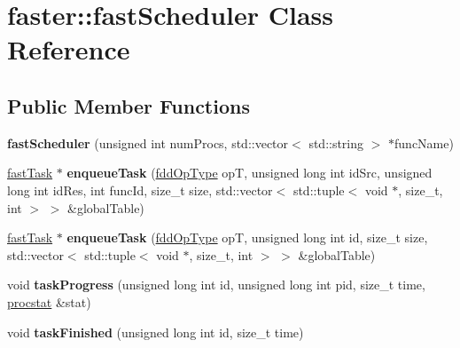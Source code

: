 \hypertarget{classfaster_1_1fastScheduler}{}\section{faster\+:\+:fast\+Scheduler Class Reference}
\label{classfaster_1_1fastScheduler}
\subsection*{Public Member Functions}
\begin{DoxyCompactItemize}
\item 
\hypertarget{classfaster_1_1fastScheduler_a5585b9363737823bf17e6782013b04a8}{}\label{classfaster_1_1fastScheduler_a5585b9363737823bf17e6782013b04a8} 
{\bfseries fast\+Scheduler} (unsigned int num\+Procs, std\+::vector$<$ std\+::string $>$ $\ast$func\+Name)
\item 
\hypertarget{classfaster_1_1fastScheduler_a25353e0b9cac5c731973ea0d453080e0}{}\label{classfaster_1_1fastScheduler_a25353e0b9cac5c731973ea0d453080e0} 
\hyperlink{classfaster_1_1fastTask}{fast\+Task} $\ast$ {\bfseries enqueue\+Task} (\hyperlink{namespacefaster_a64379512d12d41c6e58f176939abfd80}{fdd\+Op\+Type} opT, unsigned long int id\+Src, unsigned long int id\+Res, int func\+Id, size\+\_\+t size, std\+::vector$<$ std\+::tuple$<$ void $\ast$, size\+\_\+t, int $>$ $>$ \&global\+Table)
\item 
\hypertarget{classfaster_1_1fastScheduler_a3adc513709d0c00d1d6b9f62115c9284}{}\label{classfaster_1_1fastScheduler_a3adc513709d0c00d1d6b9f62115c9284} 
\hyperlink{classfaster_1_1fastTask}{fast\+Task} $\ast$ {\bfseries enqueue\+Task} (\hyperlink{namespacefaster_a64379512d12d41c6e58f176939abfd80}{fdd\+Op\+Type} opT, unsigned long int id, size\+\_\+t size, std\+::vector$<$ std\+::tuple$<$ void $\ast$, size\+\_\+t, int $>$ $>$ \&global\+Table)
\item 
\hypertarget{classfaster_1_1fastScheduler_a09db7fd6c9076e26dea68a7c925bf531}{}\label{classfaster_1_1fastScheduler_a09db7fd6c9076e26dea68a7c925bf531} 
void {\bfseries task\+Progress} (unsigned long int id, unsigned long int pid, size\+\_\+t time, \hyperlink{classfaster_1_1procstat}{procstat} \&stat)
\item 
\hypertarget{classfaster_1_1fastScheduler_af657bff84b9c117625135ca0c8f4ccf6}{}\label{classfaster_1_1fastScheduler_af657bff84b9c117625135ca0c8f4ccf6} 
void {\bfseries task\+Finished} (unsigned long int id, size\+\_\+t time)
\item 

\end{DoxyCompactItemize}
